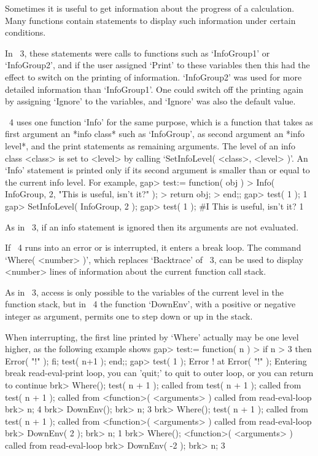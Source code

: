 Sometimes it is useful to get information about the progress of a
calculation.
Many {\GAP} functions contain statements to display such information
under certain conditions.

In {\GAP}~3, these statements were calls to functions such as
`InfoGroup1' or `InfoGroup2', and if the user assigned `Print' to
these variables then this had the effect to switch on the printing of
information.
`InfoGroup2' was used for more detailed information than `InfoGroup1'.
One could switch off the printing again by assigning `Ignore' to the
variables, and `Ignore' was also the default value.

{\GAP}~4 uses one function `Info' for the same purpose,
which is a function that takes as first argument an *info class* such as
`InfoGroup', as second argument an *info level*, and the print statements
as remaining arguments.
The level of an info class <class> is set to <level> by calling
`SetInfoLevel( <class>, <level> )'.
An `Info' statement is printed only if its second argument is smaller than
or equal to the current info level.
For example,
\begintt
gap> test:= function( obj )
> Info( InfoGroup, 2, "This is useful, isn't it?" );
> return obj;
> end;;
gap> test( 1 );
1
gap> SetInfoLevel( InfoGroup, 2 );
gap> test( 1 );
#I  This is useful, isn't it?
1
\endtt

As in {\GAP}~3, if an info statement is ignored then its arguments are
not evaluated.



If {\GAP}~4 runs into an error or is interrupted,
it enters a break loop.
The command `Where( <number> )', which replaces `Backtrace' of {\GAP}~3,
can be used to display <number> lines of information about the current
function call stack.

As in {\GAP}~3, access is only possible to the variables of the current
level in the function stack,
but in {\GAP}~4 the function `DownEnv', with a positive or negative
integer as argument, permits one to step down or up in the
stack.

When interrupting, the first line printed by `Where' actually may be
one level higher, as the following example shows
\begintt
gap> test:= function( n )
>    if n > 3 then Error( "!" ); fi; test( n+1 ); end;;
gap> test( 1 );
Error ! at
Error( "!" );
Entering break read-eval-print loop,
you can 'quit;' to quit to outer loop,
or you can return to continue
brk> Where();
test( n + 1 ); called from
test( n + 1 ); called from
test( n + 1 ); called from
<function>( <arguments> ) called from read-eval-loop
brk> n;
4
brk> DownEnv();
brk> n;
3
brk> Where();
test( n + 1 ); called from
test( n + 1 ); called from
<function>( <arguments> ) called from read-eval-loop
brk> DownEnv( 2 );
brk> n;
1
brk> Where();
<function>( <arguments> ) called from read-eval-loop
brk> DownEnv( -2 );
brk> n;
3
\endtt

